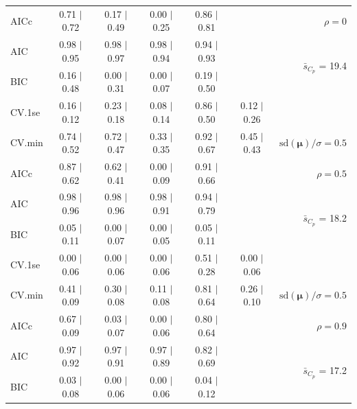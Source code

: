\documentclass[12pt]{article}
\newcommand{\mr}[1]{\mathrm{#1}}
\newcommand{\bm}[1]{\mathbf{#1}}
\begin{document}
\begin{table}[p]
\begin{center}
\begin{tabular}{l*{5}{c}|r}
AICc & 0.71 $\mid$ 0.72 & 0.17 $\mid$ 0.49 & 0.00 $\mid$ 0.25 & 0.86 $\mid$ 0.81 & & $\rho=0$ \\
AIC & 0.98 $\mid$ 0.95 & 0.98 $\mid$ 0.97 & 0.98 $\mid$ 0.94 & 0.94 $\mid$ 0.93 & & \multirow{2}{*}{$\bar{s}_{C_p}$ = 19.4} \\
BIC & 0.16 $\mid$ 0.48 & 0.00 $\mid$ 0.31 & 0.00 $\mid$ 0.07 & 0.19 $\mid$ 0.50 & & \\
 \hline 
CV.1se & 0.16 $\mid$ 0.12 & 0.23 $\mid$ 0.18 & 0.08 $\mid$ 0.14 & 0.86 $\mid$ 0.50 & 0.12 $\mid$ 0.26 &\\
CV.min & 0.74 $\mid$ 0.52 & 0.72 $\mid$ 0.47 & 0.33 $\mid$ 0.35 & 0.92 $\mid$ 0.67 & 0.45 $\mid$ 0.43 &  $\mr{sd}(\bm{\mu})/\sigma=0.5$ \\
AICc & 0.87 $\mid$ 0.62 & 0.62 $\mid$ 0.41 & 0.00 $\mid$ 0.09 & 0.91 $\mid$ 0.66 & & $\rho=0.5$ \\
AIC & 0.98 $\mid$ 0.96 & 0.98 $\mid$ 0.96 & 0.98 $\mid$ 0.91 & 0.94 $\mid$ 0.79 & & \multirow{2}{*}{$\bar{s}_{C_p}$ = 18.2} \\
BIC & 0.05 $\mid$ 0.11 & 0.00 $\mid$ 0.07 & 0.00 $\mid$ 0.05 & 0.05 $\mid$ 0.11 & & \\
 \hline 
CV.1se & 0.00 $\mid$ 0.06 & 0.00 $\mid$ 0.06 & 0.00 $\mid$ 0.06 & 0.51 $\mid$ 0.28 & 0.00 $\mid$ 0.06 &\\
CV.min & 0.41 $\mid$ 0.09 & 0.30 $\mid$ 0.08 & 0.11 $\mid$ 0.08 & 0.81 $\mid$ 0.64 & 0.26 $\mid$ 0.10 &  $\mr{sd}(\bm{\mu})/\sigma=0.5$ \\
AICc & 0.67 $\mid$ 0.09 & 0.03 $\mid$ 0.07 & 0.00 $\mid$ 0.06 & 0.80 $\mid$ 0.64 & & $\rho=0.9$ \\
AIC & 0.97 $\mid$ 0.92 & 0.97 $\mid$ 0.91 & 0.97 $\mid$ 0.89 & 0.82 $\mid$ 0.69 & & \multirow{2}{*}{$\bar{s}_{C_p}$ = 17.2} \\
BIC & 0.03 $\mid$ 0.08 & 0.00 $\mid$ 0.06 & 0.00 $\mid$ 0.06 & 0.04 $\mid$ 0.12 & & \\
 \hline 
 \end{tabular}
\end{center}
\vspace{-1cm}
\end{table}
\end{document}
